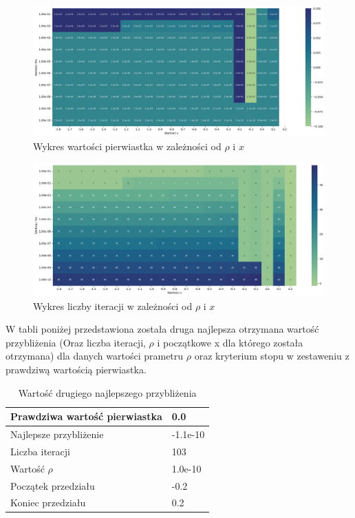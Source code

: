 \documentclass{article}
\begin{document}
\begin{figure}[H]
  \centering
  \begin{minipage}[b]{0.9\textwidth}
    \includegraphics[width=\textwidth]{heatmap21.png}
  \end{minipage}
  \caption{Wykres wartości pierwiastka w zależności od \(\rho\) i \(x\)}
\end{figure}

\begin{figure}[H]
  \centering
  \begin{minipage}[b]{0.9\textwidth}
    \includegraphics[width=\textwidth]{heatmap22.png}
  \end{minipage}
  \caption{Wykres liczby iteracji w zależności od \(\rho\) i \(x\)}
\end{figure}

\noindent
W tabli poniżej przedstawiona została druga najlepsza otrzymana wartość przybliżenia (Oraz liczba iteracji, \(\rho\) i początkowe x dla którego została otrzymana) dla danych wartości prametru \(\rho\) oraz kryterium stopu w zestaweniu z prawdziwą wartością pierwiastka.

\begin{table}[H]
    \centering
    \begin{tabular}{|l|l|}
    \hline
        Prawdziwa wartość pierwiastka & 0.0 \\ \hline
        Najlepsze przybliżenie & -1.1e-10 \\ \hline
        Liczba iteracji & 103 \\ \hline
        Wartość $\rho$ & 1.0e-10 \\ \hline
        Początek przedziału & -0.2 \\ \hline
        Koniec przedziału & 0.2 \\ \hline
    \end{tabular}
    \caption{Wartość drugiego najlepszego przybliżenia}
\end{table}
\end{document}
